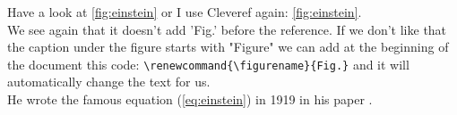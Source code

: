\documentclass[a4paper]{article} %
\renewcommand{\figurename}{Fig.}
\begin{document}
Have a look at \ref{fig:einstein} or I use Cleveref again: \cref{fig:einstein}.\\
We see again that it doesn't add 'Fig.' before the reference. If we don't like that the caption under the figure starts with "Figure" we can add at the beginning of the document this code: \verb|\renewcommand{\figurename}{Fig.}| and it will automatically change the text for us.\\
He wrote the famous equation (\cref{eq:einstein}) in 1919 in his paper \cite{Einstein1919}.

\newpage

\printbibliography
\end{document}
